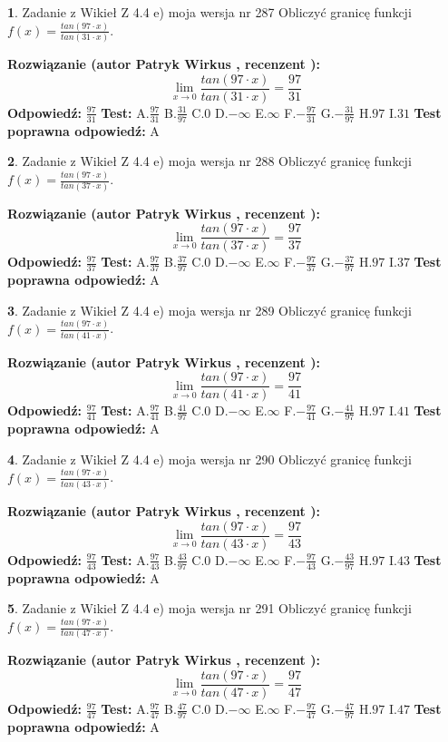 \documentclass[12pt, a4paper]{article}
\theoremstyle{definition} %
\newtheorem{zad}{}
\newcommand{\zadStart}[1]{\begin{zad}#1\newline}
\newcommand{\zadStop}{\end{zad}}
\newcommand{\rozwStart}[2]{\noindent \textbf{Rozwiązanie (autor #1 , recenzent #2): }\newline}
\newcommand{\rozwStop}{\newline}
\newcommand{\odpStart}{\noindent \textbf{Odpowiedź:}\newline}
\newcommand{\odpStop}{\newline}
\newcommand{\testStart}{\noindent \textbf{Test:}\newline}
\newcommand{\testStop}{\newline}
\newcommand{\kluczStart}{\noindent \textbf{Test poprawna odpowiedź:}\newline}
\newcommand{\kluczStop}{\newline}
\begin{document}
\zadStart{Zadanie z Wikieł Z 4.4 e) moja wersja nr 287}
Obliczyć granicę funkcji $f(x)=\frac{tan(97\cdot x)}{tan(31\cdot x)}$.
\zadStop
\rozwStart{Patryk Wirkus}{}
$$\lim\limits_{x\to 0}\frac{tan(97\cdot x)}{tan(31\cdot x)}=
\frac{97}{31}$$
\rozwStop
\odpStart
$\frac{97}{31}$
\odpStop
\testStart
A.$\frac{97}{31}$
B.$\frac{31}{97}$
C.$0$
D.$-\infty$
E.$\infty$
F.$-\frac{97}{31}$
G.$-\frac{31}{97}$
H.$97$
I.$31$
\testStop
\kluczStart
A
\kluczStop



\zadStart{Zadanie z Wikieł Z 4.4 e) moja wersja nr 288}
Obliczyć granicę funkcji $f(x)=\frac{tan(97\cdot x)}{tan(37\cdot x)}$.
\zadStop
\rozwStart{Patryk Wirkus}{}
$$\lim\limits_{x\to 0}\frac{tan(97\cdot x)}{tan(37\cdot x)}=
\frac{97}{37}$$
\rozwStop
\odpStart
$\frac{97}{37}$
\odpStop
\testStart
A.$\frac{97}{37}$
B.$\frac{37}{97}$
C.$0$
D.$-\infty$
E.$\infty$
F.$-\frac{97}{37}$
G.$-\frac{37}{97}$
H.$97$
I.$37$
\testStop
\kluczStart
A
\kluczStop



\zadStart{Zadanie z Wikieł Z 4.4 e) moja wersja nr 289}
Obliczyć granicę funkcji $f(x)=\frac{tan(97\cdot x)}{tan(41\cdot x)}$.
\zadStop
\rozwStart{Patryk Wirkus}{}
$$\lim\limits_{x\to 0}\frac{tan(97\cdot x)}{tan(41\cdot x)}=
\frac{97}{41}$$
\rozwStop
\odpStart
$\frac{97}{41}$
\odpStop
\testStart
A.$\frac{97}{41}$
B.$\frac{41}{97}$
C.$0$
D.$-\infty$
E.$\infty$
F.$-\frac{97}{41}$
G.$-\frac{41}{97}$
H.$97$
I.$41$
\testStop
\kluczStart
A
\kluczStop



\zadStart{Zadanie z Wikieł Z 4.4 e) moja wersja nr 290}
Obliczyć granicę funkcji $f(x)=\frac{tan(97\cdot x)}{tan(43\cdot x)}$.
\zadStop
\rozwStart{Patryk Wirkus}{}
$$\lim\limits_{x\to 0}\frac{tan(97\cdot x)}{tan(43\cdot x)}=
\frac{97}{43}$$
\rozwStop
\odpStart
$\frac{97}{43}$
\odpStop
\testStart
A.$\frac{97}{43}$
B.$\frac{43}{97}$
C.$0$
D.$-\infty$
E.$\infty$
F.$-\frac{97}{43}$
G.$-\frac{43}{97}$
H.$97$
I.$43$
\testStop
\kluczStart
A
\kluczStop



\zadStart{Zadanie z Wikieł Z 4.4 e) moja wersja nr 291}
Obliczyć granicę funkcji $f(x)=\frac{tan(97\cdot x)}{tan(47\cdot x)}$.
\zadStop
\rozwStart{Patryk Wirkus}{}
$$\lim\limits_{x\to 0}\frac{tan(97\cdot x)}{tan(47\cdot x)}=
\frac{97}{47}$$
\rozwStop
\odpStart
$\frac{97}{47}$
\odpStop
\testStart
A.$\frac{97}{47}$
B.$\frac{47}{97}$
C.$0$
D.$-\infty$
E.$\infty$
F.$-\frac{97}{47}$
G.$-\frac{47}{97}$
H.$97$
I.$47$
\testStop
\kluczStart
A
\kluczStop
\end{document}
